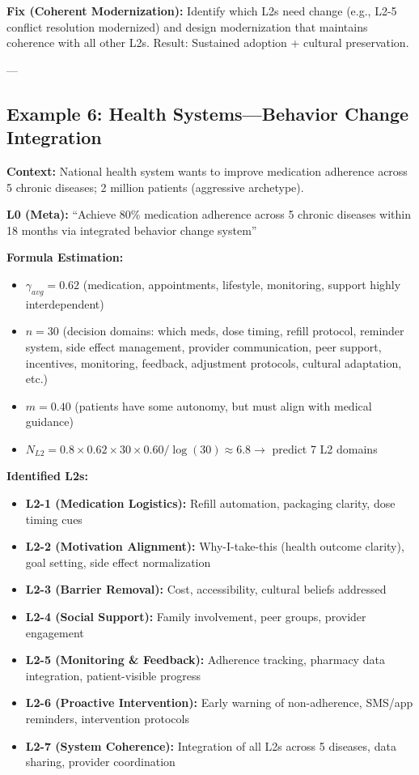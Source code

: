 \documentclass[11pt, a4paper]{article}
\begin{document}
\textbf{Fix (Coherent Modernization):} Identify which L2s need change (e.g., L2-5 conflict resolution modernized) and design modernization that maintains coherence with all other L2s. Result: Sustained adoption + cultural preservation.

---

\subsection{Example 6: Health Systems---Behavior Change Integration} \label{sec:ch15-part4g}

\textbf{Context:} National health system wants to improve medication adherence across 5 chronic diseases; 2 million patients (aggressive archetype).

\textbf{L0 (Meta):} ``Achieve 80\% medication adherence across 5 chronic diseases within 18 months via integrated behavior change system''

\textbf{Formula Estimation:}
\begin{itemize}[nosep]
    \item $\gamma_{avg} = 0.62$ (medication, appointments, lifestyle, monitoring, support highly interdependent)
    \item $n = 30$ (decision domains: which meds, dose timing, refill protocol, reminder system, side effect management, provider communication, peer support, incentives, monitoring, feedback, adjustment protocols, cultural adaptation, etc.)
    \item $m = 0.40$ (patients have some autonomy, but must align with medical guidance)
    \item $N_{L2} = 0.8 \times 0.62 \times 30 \times 0.60 / \log(30) \approx 6.8 \rightarrow$ predict 7 L2 domains
\end{itemize}

\textbf{Identified L2s:}
\begin{itemize}[nosep]
    \item \textbf{L2-1 (Medication Logistics):} Refill automation, packaging clarity, dose timing cues
    \item \textbf{L2-2 (Motivation Alignment):} Why-I-take-this (health outcome clarity), goal setting, side effect normalization
    \item \textbf{L2-3 (Barrier Removal):} Cost, accessibility, cultural beliefs addressed
    \item \textbf{L2-4 (Social Support):} Family involvement, peer groups, provider engagement
    \item \textbf{L2-5 (Monitoring \& Feedback):} Adherence tracking, pharmacy data integration, patient-visible progress
    \item \textbf{L2-6 (Proactive Intervention):} Early warning of non-adherence, SMS/app reminders, intervention protocols
    \item \textbf{L2-7 (System Coherence):} Integration of all L2s across 5 diseases, data sharing, provider coordination
\end{itemize}
\end{document}
